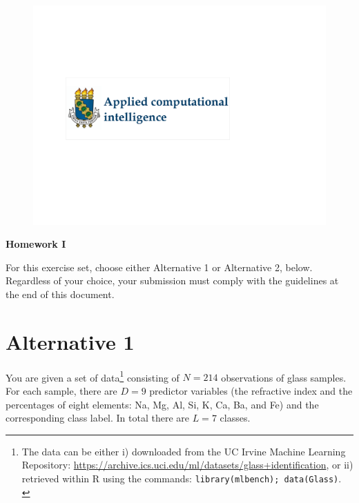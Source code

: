 \documentclass[a4paper,11pt]{article}
\begin{document}
\begin{figure}[!h] \includegraphics [scale=0.3] {Course-logo} \end{figure}
{\Large \noindent \bf Homework I} 
\vskip0.8cm

\noindent For this exercise set, choose either Alternative 1 or Alternative 2, below. Regardless of your choice, your submission must comply with the guidelines at the end of this document.

\section*{Alternative 1}
\noindent You are given a set of data\footnote{The data can be either i) downloaded from the UC Irvine Machine Learning Repository: \url{https://archive.ics.uci.edu/ml/datasets/glass+identification}, or ii) retrieved within R using the commands: \texttt{library(mlbench); data(Glass)}. \\} consisting of $N=214$ observations of glass samples. For each sample, there are $D=9$ predictor variables (the refractive index and the percentages of eight elements: Na, Mg, Al, Si, K, Ca, Ba, and Fe) and the corresponding class label. In total there are $L=7$ classes.
\end{document}

